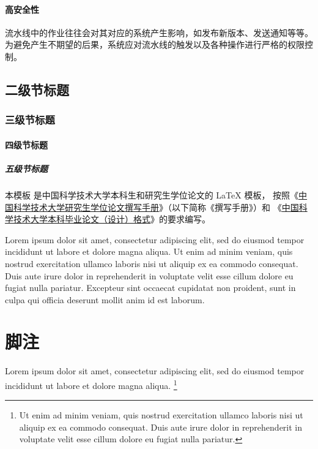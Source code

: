 \paragraph{高安全性}
流水线中的作业往往会对其对应的系统产生影响，如发布新版本、发送通知等等。
为避免产生不期望的后果，系统应对流水线的触发以及各种操作进行严格的权限控制。

\subsection{二级节标题}

\subsubsection{三级节标题}

\paragraph{四级节标题}

\subparagraph{五级节标题}

本模板  是中国科学技术大学本科生和研究生学位论文的 \LaTeX{}
模板， 按照《\href{https://gradschool.ustc.edu.cn/static/upload/article/picture/ce3b02e5f0274c90b9331ef50ae1ac26.pdf}
{中国科学技术大学研究生学位论文撰写手册}》（以下简称《撰写手册》）和
《\href{https://www.teach.ustc.edu.cn/?attachment_id=13867}
{中国科学技术大学本科毕业论文（设计）格式}》的要求编写。

Lorem ipsum dolor sit amet, consectetur adipiscing elit, sed do eiusmod tempor
incididunt ut labore et dolore magna aliqua.
Ut enim ad minim veniam, quis nostrud exercitation ullamco laboris nisi ut
aliquip ex ea commodo consequat.
Duis aute irure dolor in reprehenderit in voluptate velit esse cillum dolore eu
fugiat nulla pariatur.
Excepteur sint occaecat cupidatat non proident, sunt in culpa qui officia
deserunt mollit anim id est laborum.



\section{脚注}

Lorem ipsum dolor sit amet, consectetur adipiscing elit, sed do eiusmod tempor
incididunt ut labore et dolore magna aliqua.
\footnote{Ut enim ad minim veniam, quis nostrud exercitation ullamco laboris
  nisi ut aliquip ex ea commodo consequat.
  Duis aute irure dolor in reprehenderit in voluptate velit esse cillum dolore
  eu fugiat nulla pariatur.}
